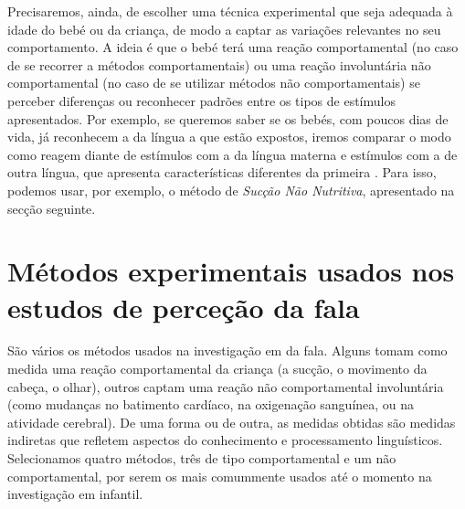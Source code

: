 \documentclass[output=paper]{LSP/langsci}
\begin{document}
Precisaremos, ainda, de escolher uma técnica experimental que seja adequada à idade do bebé ou da criança, de modo a captar as variações relevantes no seu comportamento. A ideia é que o bebé terá uma reação comportamental (no caso de se recorrer a métodos comportamentais) ou uma reação involuntária não comportamental (no caso de se utilizar métodos não comportamentais) se perceber diferenças ou reconhecer padrões entre os tipos de estímulos apresentados. Por exemplo, se queremos saber se os bebés, com poucos dias de vida, já reconhecem a  da língua a que estão expostos, iremos comparar o modo como reagem diante de estímulos com a  da língua materna e estímulos com a  de outra língua, que apresenta características diferentes da primeira \citep{nazzi_etal1998}.  Para isso, podemos usar, por exemplo, o método de \textit{Sucção Não Nutritiva}, apresentado na secção seguinte.

\section{Métodos experimentais usados nos estudos de perceção da fala}
\label{sec:frota_metodos}

São vários os métodos usados na investigação em  da fala. Alguns tomam como medida uma reação comportamental da criança (a sucção, o movimento da cabeça, o olhar), outros captam uma reação não comportamental involuntária (como mudanças no batimento cardíaco, na oxigenação sanguínea, ou na atividade cerebral). De uma forma ou de outra, as medidas obtidas são medidas indiretas que refletem aspectos do conhecimento e processamento linguísticos. Selecionamos quatro métodos, três de tipo comportamental e um não comportamental, por serem os mais comummente usados até o momento na investigação em  infantil.
\end{document}
